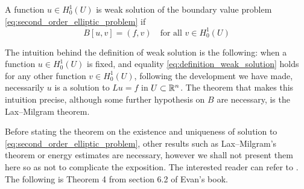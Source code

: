 \begin{definition} \label{def:weak_solution}
	A function $u \in H^1_0(U)$ is weak solution of the boundary value problem
	\eqref{eq:second_order_elliptic_problem} if
	\begin{equation} \label{eq:definition_weak_solution}
		B[u,v] = (f,v) \quad \text{for all } v \in H^1_0(U)
	\end{equation}
\end{definition}

\noindent
The intuition behind the definition of weak solution is the following: when a
function $u \in H^1_0(U)$ is fixed, and equality
\eqref{eq:definition_weak_solution} holds for any other function $v \in
H^1_0(U)$, following the development we have made, necessarily $u$ is a solution
to $L u = f$ in $U \subset \mathbb{R}^n$. The theorem that makes this intuition
precise, although some further hypothesis on $B$ are necessary, is the
Lax--Milgram theorem. 

Before stating the theorem on the existence and uniqueness of solution to
\eqref{eq:second_order_elliptic_problem}, other results such as Lax--Milgram's
theorem or energy estimates are necessary, however we shall not present them
here so as not to complicate the exposition. The interested reader can refer to
\cite{evans1998pde}. The following is Theorem 4 from section 6.2 of Evan's book.

